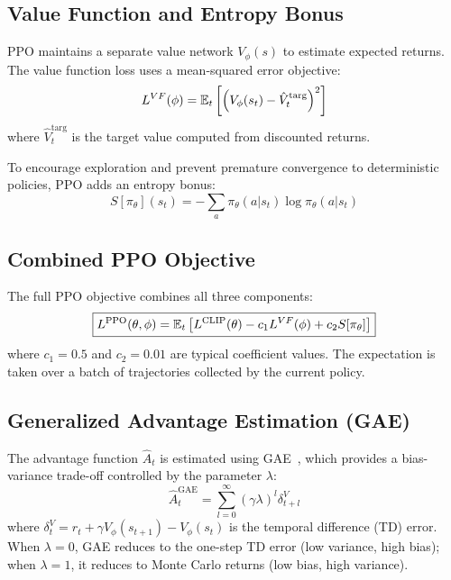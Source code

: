 \subsection{Value Function and Entropy Bonus}

PPO maintains a separate value network $V_\phi(s)$ to estimate expected returns. The value function loss uses a mean-squared error objective:
\begin{equation}
L^{VF}(\phi) = \mathbb{E}_t\left[\left(V_\phi(s_t) - \hat{V}_t^{\text{targ}}\right)^2\right]
\end{equation}
where $\hat{V}_t^{\text{targ}}$ is the target value computed from discounted returns.

To encourage exploration and prevent premature convergence to deterministic policies, PPO adds an entropy bonus:
\begin{equation}
S[\pi_\theta](s_t) = -\sum_{a} \pi_\theta(a|s_t)\log\pi_\theta(a|s_t)
\end{equation}

\subsection{Combined PPO Objective}

The full PPO objective combines all three components:
\begin{equation}
\boxed{L^{\text{PPO}}(\theta, \phi) = \mathbb{E}_t\left[L^{\text{CLIP}}(\theta) - c_1 L^{VF}(\phi) + c_2 S[\pi_\theta]\right]}
\label{eq:ppo}
\end{equation}
where $c_1 = 0.5$ and $c_2 = 0.01$ are typical coefficient values. The expectation is taken over a batch of trajectories collected by the current policy.

\subsection{Generalized Advantage Estimation (GAE)}

The advantage function $\hat{A}_t$ is estimated using GAE~\cite{schulman2016gae}, which provides a bias-variance trade-off controlled by the parameter $\lambda$:
\begin{equation}
\hat{A}_t^{\text{GAE}} = \sum_{l=0}^{\infty}(\gamma\lambda)^l\delta_{t+l}^{V}
\end{equation}
where $\delta_t^{V} = r_t + \gamma V_\phi(s_{t+1}) - V_\phi(s_t)$ is the temporal difference (TD) error. When $\lambda = 0$, GAE reduces to the one-step TD error (low variance, high bias); when $\lambda = 1$, it reduces to Monte Carlo returns (low bias, high variance).

